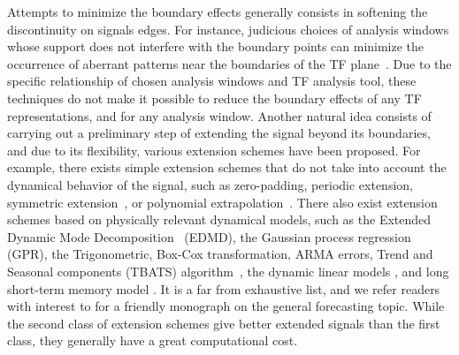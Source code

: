 \documentclass[journal]{IEEEtran}
\begin{document}
Attempts to minimize the boundary effects generally consists in softening the discontinuity on signals edges. For instance, judicious choices of analysis windows whose support does not interfere with the boundary points can minimize the occurrence of aberrant patterns near the boundaries of the TF plane~\cite{Chui92wavelets,Depczynski99fast}. Due to the specific relationship of chosen analysis windows and TF analysis tool, these techniques do not make it possible to reduce the boundary effects of any TF representations, and for any analysis window. Another natural idea consists of carrying out a preliminary step of extending the signal beyond its boundaries,
%
and due to its flexibility, various extension schemes have been proposed. For example, there exists simple extension schemes that do not take into account the dynamical behavior of the signal, such as zero-padding, periodic extension, symmetric extension~\cite{Kharitonenko02wavelet,Chen95symmetric}, or polynomial extrapolation~\cite{Williams97discrete}. There also exist extension schemes based on physically relevant dynamical models, such as the Extended Dynamic Mode Decomposition~\cite{Williams15data} (EDMD), the Gaussian process regression~\cite{Rasmussen06gaussian,Roberts13Gaussian} (GPR), the Trigonometric, Box-Cox transformation, ARMA errors, Trend and Seasonal components (TBATS) algorithm~\cite{DeLivera11forecasting}, the dynamic linear models \cite{west2006bayesian}, and long short-term memory model \cite{vlachas2018data}. It is a far from exhaustive list, and we refer readers with interest to \cite{hyndman2018forecasting} for a friendly monograph on the general forecasting topic. While the second class of extension schemes give better extended signals than the first class, they generally have a great computational cost. 
%
\end{document}
